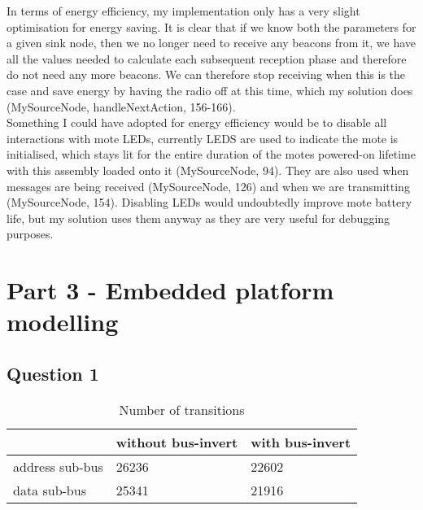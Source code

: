 \documentclass[12pt]{article} %
\begin{document}
In terms of energy efficiency, my implementation only has a very slight optimisation for energy saving. It is clear that if we know both the parameters for a given sink node, then we no longer need to receive any beacons from it, we have all the values needed to calculate each subsequent reception phase and therefore do not need any more beacons. We can therefore stop receiving when this is the case and save energy by having the radio off at this time, which my solution does (MySourceNode, handleNextAction, 156-166).
\\

Something I could have adopted for energy efficiency would be to disable all interactions with mote LEDs, currently LEDS are used to indicate the mote is initialised, which stays lit for the entire duration of the motes powered-on lifetime with this assembly loaded onto it (MySourceNode, 94). They are also used when messages are being received (MySourceNode, 126) and when we are transmitting (MySourceNode, 154). Disabling LEDs would undoubtedly improve mote battery life, but my solution uses them anyway as they are very useful for debugging purposes.



\section{Part 3 - Embedded platform modelling}

\subsection{Question 1}

\begin{table}[H]
\centering
\caption{Number of transitions}
\label{my-label}
\begin{tabular}{|l|l|l|}
\hline
                & without bus-invert & with bus-invert \\ \hline
address sub-bus & 26236              & 22602           \\ \hline
data sub-bus    & 25341              & 21916           \\ \hline
\end{tabular}
\end{table}
\end{document}
